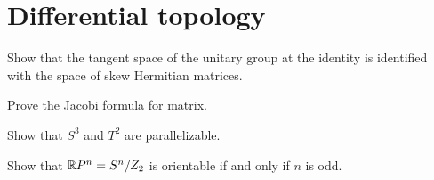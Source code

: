 \documentclass[12pt]{article}
\begin{document}
\section{Differential topology}

	\begin{prb}
	Show that the tangent space of the unitary group at the identity is identified with the space of skew Hermitian matrices.
	\end{prb}

	\begin{prb}
	Prove the Jacobi formula for matrix.
	\end{prb}

	\begin{prb}
	Show that $S^3$ and $T^2$ are parallelizable.
	\end{prb}

	\begin{prb}
	Show that $\mathbb{R} P^n=S^n/Z_2$ is orientable if and only if $n$ is odd.
	\end{prb}
\end{document}
